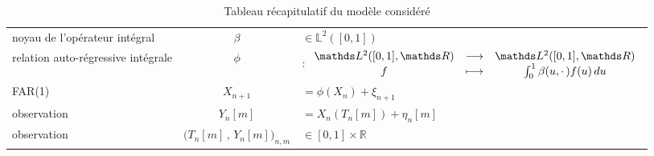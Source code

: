 \begin{table}[H]
\begin{tabularx}{\textwidth}{XcX}
		\midrule
		noyau de l'opérateur intégral                & $\beta$                                     & $\in \mathds L^2([0,1])$                                                                                           \\
		relation auto-régressive intégrale           & $\phi$                                      & $: \func{\mathds L^2([0,1], \mathds R)}{\mathds L^2([0,1], \mathds R)}{f}{\int_0^1 \beta(u, \cdot \, )f(u) \, du}$ \\
		FAR(1)                                       & $X_{n+1}$                                   & $= \phi( X_n )+ \xi_{n+1}$                                                                                         \\
		\midrule
		observation                                  & $Y_n[m]$                                    & $= X_n( T_n[m] ) + \eta_{n}[m] $                                                                                \\
		observation                                  & $\bigl( T_n[m] \, , \, Y_n[m] \bigr)_{n,m}$ & $\in [0,1] \times \mathds R$                                                                                       \\
		\bottomrule
	\end{tabularx}
	\caption{Tableau récapitulatif du modèle considéré}
	\label{tab:model}
\end{table}

